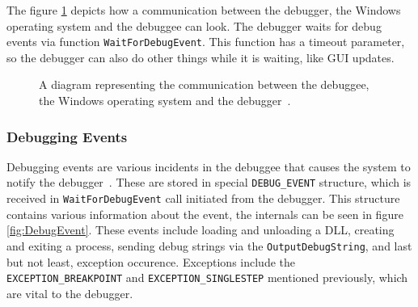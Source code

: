 The figure \ref{fig:win32debugger} depicts how a communication between the
debugger, the Windows operating system and the debuggee can look. The debugger
waits for debug events via function \texttt{WaitForDebugEvent}. This
function has a timeout parameter, so the debugger can also do other things
while it is waiting, like GUI updates.

\begin{figure}
    \centering
    \caption{A diagram representing the communication between the debuggee, the Windows operating system and the debugger~\cite{windows-dbg-api-rev}.}
    \label{fig:win32debugger}
\end{figure}
 
\subsubsection*{Debugging Events}\label{section:Debug Events}
Debugging events are various incidents in the debuggee that causes the system
to notify the debugger~\cite{windows-msdn-debug-events}. These are stored in
special \texttt{DEBUG_EVENT} structure, which is received in
\texttt{WaitForDebugEvent} call initiated from the debugger. This
structure contains various information about the event, the internals can be
seen in figure \ref{fig:DebugEvent}. These events include loading and unloading
a DLL, creating and exiting a process, sending debug strings via the
\texttt{OutputDebugString}, and last but not least, exception occurence.
Exceptions include the \verb|EXCEPTION_BREAKPOINT| and
\verb|EXCEPTION_SINGLESTEP| mentioned previously, which are vital to the
debugger.

